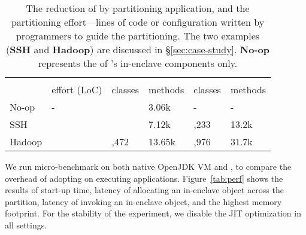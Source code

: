 \begin{table}[t!b!]
\caption{The reduction of \tcbsize{} by partitioning application, and the partitioning effort---lines of code or configuration written by programmers to guide the partitioning.
The two examples ({\bf SSH} and {\bf Hadoop}) are discussed in \S\ref{sec:case-study}.	 %
{\bf No-op} represents the \tcbsize{} of \sysname{}'s in-enclave components only.}
\small
\centering
\tabcolsep=5pt
\begin{tabular}{>{\centering\arraybackslash}p{0.4in}>{\raggedleft\arraybackslash}p{0.4in}>{\raggedleft\arraybackslash}p{0.45in}>{\raggedleft\arraybackslash}p{0.5in}>{\raggedleft\arraybackslash}p{0.45in}>{\raggedleft\arraybackslash}p{0.5in}}
\hline
\addlinespace[2pt]
{\bf App} & \multicolumn{3}{c}{{\bf Partitioned with \sysname{}}} & \multicolumn{2}{c}{{\bf Non-partitioned}}  \\
 & effort (LoC) & classes & methods & classes & methods \\
No-op   &   - &   544 & 3.06k & - & - \\
SSH     &  18 &   972 & 7.12k & 1,233 & 13.2k \\
Hadoop  & 800 & 2,472 & 13.65k & 2,976 & 31.7k \\
\hline
\end{tabular}
\label{tab:case-tcb}
\end{table}


\label{sec:eval:microbench}

We run micro-benchmark on both native OpenJDK VM and \sysname{}, to compare the overhead of adopting \sysname{} on executing \java{} applications.
Figure~\ref{tab:perf} shows the results of start-up time, latency of allocating an in-enclave object across the partition, 
latency of invoking an in-enclave object, and the highest memory footprint.
For the stability of the experiment, we disable the \java{} JIT optimization in all settings.


